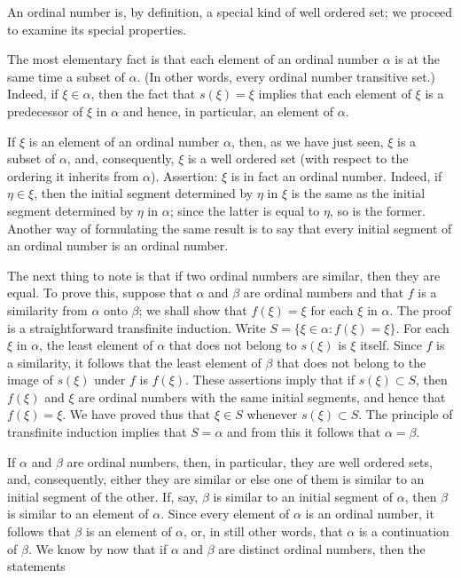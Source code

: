 
An ordinal number is, by definition, a special kind of well ordered set; we proceed to examine its special properties. 

The most elementary fact is that each element of an ordinal number $\alpha$ is at the same time a subset of $\alpha$. (In other words, every ordinal number transitive set.) Indeed, if $\xi \in \alpha$, then the fact that $s( \xi ) = \xi$ implies that each element of $\xi$ is a predecessor of $\xi$ in $\alpha$ and hence, in particular, an element of $\alpha$. 

If $\xi$ is an element of an ordinal number $\alpha$, then, as we have just seen, $\xi$ is a subset of $\alpha$, and, consequently, $\xi$ is a well ordered set (with respect to the ordering it inherits from $\alpha$). Assertion: $\xi$ is in fact an ordinal number. Indeed, if $\eta \in \xi$, then the initial segment determined by $\eta$ in $\xi$ is the same as the initial segment determined by $\eta$ in $\alpha$; since the latter is equal to $\eta$, so is the former. Another way of formulating the same result is to say that every initial segment of an ordinal number is an ordinal number. 

The next thing to note is that if two ordinal numbers are similar, then they are equal. To prove this, suppose that $\alpha$ and $\beta$ are ordinal numbers and that $f$ is a similarity from $\alpha$ onto $\beta$; we shall show that $f( \xi ) = \xi$ for each $\xi$ in $\alpha$. The proof is a straightforward transfinite induction. Write $S = \{ \xi \in \alpha : f( \xi ) = \xi \}$. For each $\xi$ in $\alpha$, the least element of $\alpha$ that does not belong to $s( \xi )$ is $\xi$ itself. Since $f$ is a similarity, it follows that the least element of $\beta$ that does not belong to the image of $s( \xi )$ under $f$ is $f( \xi )$. These assertions imply that if $s( \xi ) \subset S$, then $f(\xi )$ and $\xi$ are ordinal numbers with the same initial segments, and hence that $f(\xi ) = \xi$. We have proved thus that $\xi \in S$ whenever  $s( \xi ) \subset S$. The principle of transfinite induction implies that $S = \alpha$ and from this it follows that $\alpha = \beta$.

If $\alpha$ and $\beta$ are ordinal numbers, then, in particular, they are well ordered sets, and, consequently, either they are similar or else one of them is similar to an initial segment of the other. If, say, $\beta$ is similar to an initial segment of $\alpha$, then $\beta$ is similar to an element of $\alpha$. Since every element of $\alpha$ is an ordinal number, it follows that $\beta$ is an element of $\alpha$, or, in still other words, that $\alpha$ is a continuation of $\beta$. We know by now that if $\alpha$ and $\beta$ are distinct ordinal numbers, then the statements 

